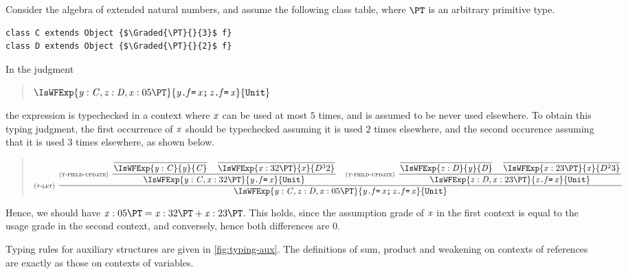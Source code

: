 \begin{example}\label{ex:ex1}
Consider the algebra of extended natural numbers,  and assume the following class table, where $\PT$ is an arbitrary primitive type. 
\begin{lstlisting}
class C extends Object {$\Graded{\PT}{}{3}$ f}
class D extends Object {$\Graded{\PT}{}{2}$ f}
\end{lstlisting}
In the judgment 
\begin{quote}
$\IsWFExp{\CtxElem{\y}{}{}{\C}, \CtxElem{\z}{}{}{\D}, \CtxElem{\x}{0}{5}{\PT}}{\Seq{\FieldUpdate{\y}{\f}{\x}}{\FieldUpdate{\z}{\f}{\x}}}{\Unit}$
\end{quote}
the expression is typechecked in a context where $\mathit{x}$ can be used at most $5$ times, and is assumed to be never used elsewhere. 
To obtain this typing judgment, the first occurrence of $\mathit{x}$ should be typechecked assuming it is used $2$ times elsewhere, and the second occurence assuming that it is used $3$ times elsewhere, as shown below.
\begin{small}
\begin{quote}
\begin{math}
\\
\NamedRule{t-let}{
\NamedRule{t-field-update}
{
\Rule{}{\IsWFExp{\CtxElem{\y}{}{}{\C}}{\y}{\C}}{}\Space\Rule{}{\IsWFExp{\CtxElem{\x}{3}{2}{\PT}}{\x}{\Graded{D}{3}{2}}}{}
}
{\IsWFExp{\CtxElem{\y}{}{}{\C},\CtxElem{\x}{3}{2}{\PT}}{\FieldUpdate{\y}{\f}{\x}}{\Unit}}{}
\Space
\NamedRule{t-field-update}
{
\Rule{}{\IsWFExp{\CtxElem{\z}{}{}{\D}}{\y}{\D}}{}\Space\Rule{}{\IsWFExp{\CtxElem{\x}{2}{3}{\PT}}{\x}{\Graded{D}{2}{3}}}{}
}
{\IsWFExp{\CtxElem{\z}{}{}{\D},\CtxElem{\x}{2}{3}{\PT}}{\FieldUpdate{\z}{\f}{\x}}{\Unit}}{}
}
{
\IsWFExp{\CtxElem{\y}{}{}{\C}, \CtxElem{\z}{}{}{\D}, \CtxElem{\x}{0}{5}{\PT}}{\Seq{\FieldUpdate{\y}{\f}{\x}}{\FieldUpdate{\z}{\f}{\x}}}{\Unit}
}{}
\\
\end{math}
\end{quote}
\end{small}

Hence, we should have $\CtxElem{\x}{0}{5}{\PT}=\CtxElem{\x}{3}{2}{\PT}\ctxsum\CtxElem{\x}{2}{3}{\PT}$. 
This holds, since the assumption grade of $\mathit{x}$ in the first context is equal to the usage grade in the second context, and conversely, hence both differences are $0$.

\end{example}


Typing rules for auxiliary structures are given in \cref{fig:typing-aux}.  The definitions of sum, product and weakening  on contexts of references are exactly as those on contexts of variables. 

